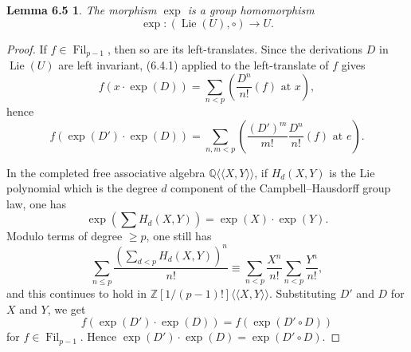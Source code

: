 \documentclass[11pt]{article}
\newcommand{\Lie}{\operatorname{Lie}}
\providecommand{\Fil}{\operatorname{Fil}}
\newtheorem*{lemma65}{Lemma 6.5}
\begin{document}
\begin{lemma65}
The morphism \(\exp\) is a group homomorphism
\begin{equation}
  \exp:(\Lie(U),\circ)\longrightarrow U.
  \tag{6.5.1}
\end{equation}
\end{lemma65}

\begin{proof}
If \(f\in\Fil_{p-1}\), then so are its left-translates. Since the derivations \(D\) in
\(\Lie(U)\) are left invariant, (6.4.1) applied to the left-translate of \(f\) gives
\begin{equation}
  f(x\cdot\exp(D))=\sum_{n<p}\left(\frac{D^n}{n!}(f)\text{ at }x\right),
  \tag{6.5.2}
\end{equation}
hence
\begin{equation}
  f(\exp(D')\cdot\exp(D))=
  \sum_{n,m<p}\left(\frac{(D')^m}{m!}\frac{D^n}{n!}(f)\text{ at }e\right).
  \tag{6.5.3}
\end{equation}

In the completed free associative algebra \(\mathbb Q\langle\!\langle X,Y\rangle\!\rangle\), if
\(H_d(X,Y)\) is the Lie polynomial which is the degree \(d\) component of the
Campbell--Hausdorff group law, one has
\begin{equation}
  \exp\left(\sum H_d(X,Y)\right)=\exp(X)\cdot\exp(Y).
  \tag{6.5.4}
\end{equation}
Modulo terms of degree \(\ge p\), one still has
\begin{equation}
  \sum_{n\le p}\frac{\left(\sum_{d<p}H_d(X,Y)\right)^n}{n!}
  \equiv
  \sum_{n<p}\frac{X^n}{n!}\sum_{n<p}\frac{Y^n}{n!},
  \tag{6.5.5}
\end{equation}
and this continues to hold in \(\mathbb Z[1/(p-1)!]\langle\!\langle X,Y\rangle\!\rangle\). Substituting
\(D'\) and \(D\) for \(X\) and \(Y\), we get
\begin{equation}
  f(\exp(D')\cdot\exp(D))=f(\exp(D'\circ D))
  \tag{6.5.6}
\end{equation}
for \(f\in\Fil_{p-1}\). Hence \(\exp(D')\cdot\exp(D)=\exp(D'\circ D)\).


\end{proof}
\end{document}
